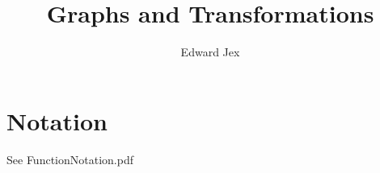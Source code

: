 \documentclass[a4paper,12pt]{article}
\begin{document}
\title{Graphs and Transformations}	
\author{Edward Jex}
\maketitle
\section*{Notation}
See FunctionNotation.pdf
\end{document}
